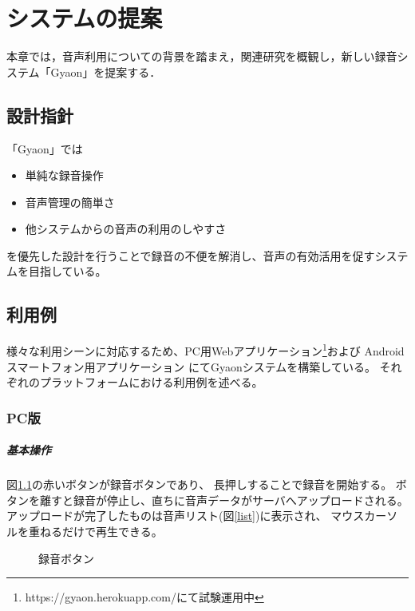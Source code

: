 \chapter{システムの提案}
\label{chap:proposal}

本章では，音声利用についての背景を踏まえ，関連研究を概観し，新しい録音システム「Gyaon」を提案する．

\newpage

\section{設計指針}

「Gyaon」では
\begin{itemize}
\item 単純な録音操作
\item 音声管理の簡単さ
\item 他システムからの音声の利用のしやすさ
\end{itemize}
を優先した設計を行うことで録音の不便を解消し、音声の有効活用を促すシステムを目指している。

\section{利用例}
様々な利用シーンに対応するため、PC用Webアプリケーション\footnote{\textsf{https://gyaon.herokuapp.com/にて試験運用中}}および
Androidスマートフォン用アプリケーション
にてGyaonシステムを構築している。
それぞれのプラットフォームにおける利用例を述べる。

\subsection{PC版}

\paragraph{基本操作}
    図\ref{button}の赤いボタンが録音ボタンであり、
    長押しすることで録音を開始する。
    ボタンを離すと録音が停止し、直ちに音声データがサーバへアップロードされる。
    アップロードが完了したものは音声リスト(図\ref{list})に表示され、
    マウスカーソルを重ねるだけで再生できる。

\begin{figure}[H]
\centering
{}
\caption{録音ボタン}
\label{button}
\end{figure}

